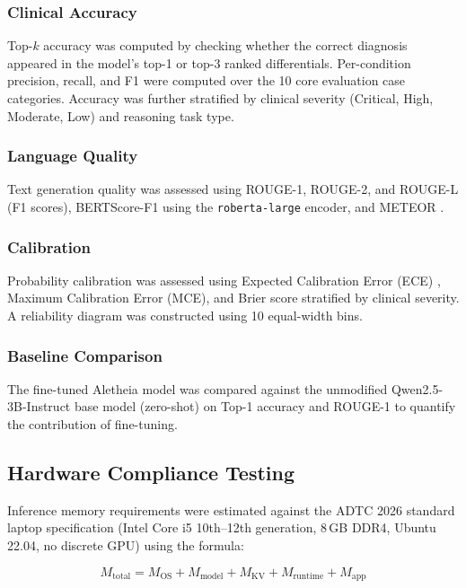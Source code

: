 \documentclass[conference]{IEEEtran}
\begin{document}
\subsubsection{Clinical Accuracy}
Top-$k$ accuracy was computed by checking whether the correct
diagnosis appeared in the model's top-1 or top-3 ranked
differentials. Per-condition precision, recall, and F1 were
computed over the 10 core evaluation case categories. Accuracy
was further stratified by clinical severity (Critical, High,
Moderate, Low) and reasoning task type.

\subsubsection{Language Quality}
Text generation quality was assessed using ROUGE-1, ROUGE-2,
and ROUGE-L \cite{lin2004rouge} (F1 scores), BERTScore-F1
\cite{zhang2019bertscore} using the \texttt{roberta-large} encoder,
and METEOR \cite{banerjee2005meteor}.

\subsubsection{Calibration}
Probability calibration was assessed using Expected Calibration
Error (ECE) \cite{naeini2015ece}, Maximum Calibration Error (MCE),
and Brier score \cite{brier1950brier} stratified by clinical
severity. A reliability diagram was constructed using 10 equal-width
bins.

\subsubsection{Baseline Comparison}
The fine-tuned Aletheia model was compared against the unmodified
Qwen2.5-3B-Instruct base model (zero-shot) on Top-1 accuracy and
ROUGE-1 to quantify the contribution of fine-tuning.

\subsection{Hardware Compliance Testing}

Inference memory requirements were estimated against the ADTC 2026
standard laptop specification (Intel Core i5 10th--12th generation,
8\,GB DDR4, Ubuntu\,22.04, no discrete GPU) using the formula:

\begin{equation}
  M_{\text{total}} = M_{\text{OS}} + M_{\text{model}} + M_{\text{KV}} + M_{\text{runtime}} + M_{\text{app}}
  \label{eq:memory}
\end{equation}
\end{document}
